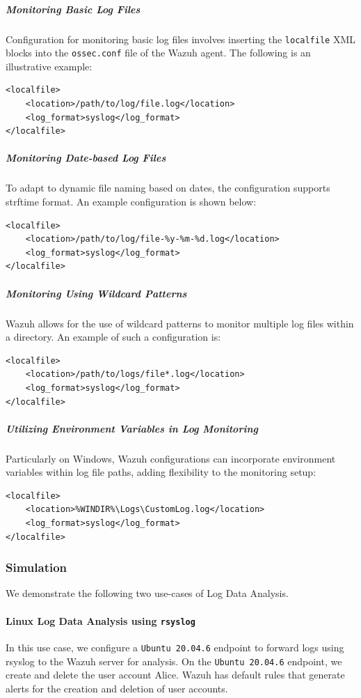 \subparagraph{Monitoring Basic Log Files}
Configuration for monitoring basic log files involves inserting the \texttt{localfile} XML blocks into the \texttt{ossec.conf} file of the Wazuh agent. The following is an illustrative example:

\begin{verbatim}
<localfile>
    <location>/path/to/log/file.log</location>
    <log_format>syslog</log_format>
</localfile>
\end{verbatim}

\subparagraph{Monitoring Date-based Log Files}
To adapt to dynamic file naming based on dates, the configuration supports strftime format. An example configuration is shown below:

\begin{verbatim}
<localfile>
    <location>/path/to/log/file-%y-%m-%d.log</location>
    <log_format>syslog</log_format>
</localfile>
\end{verbatim}

\subparagraph{Monitoring Using Wildcard Patterns}
Wazuh allows for the use of wildcard patterns to monitor multiple log files within a directory. An example of such a configuration is:

\begin{verbatim}
<localfile>
    <location>/path/to/logs/file*.log</location>
    <log_format>syslog</log_format>
</localfile>
\end{verbatim}

\subparagraph{Utilizing Environment Variables in Log Monitoring}
Particularly on Windows, Wazuh configurations can incorporate environment variables within log file paths, adding flexibility to the monitoring setup:

\begin{verbatim}
<localfile>
    <location>%WINDIR%\Logs\CustomLog.log</location>
    <log_format>syslog</log_format>
</localfile>
\end{verbatim}


\subsubsection{Simulation}
We demonstrate the following two use-cases of Log Data Analysis.
\paragraph{Linux Log Data Analysis using \texttt{rsyslog}}
In this use case, we configure a \texttt{Ubuntu 20.04.6} endpoint to forward logs using rsyslog to the Wazuh server for analysis. On the \texttt{Ubuntu 20.04.6} endpoint, we create and delete the user account Alice. Wazuh has default rules that generate alerts for the creation and deletion of user accounts.


